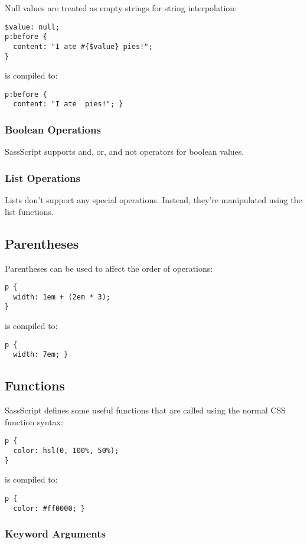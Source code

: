 \documentclass[10pt]{article}
\begin{document}
 Null values are treated as empty strings for string interpolation:
\begin{verbatim}
$value: null;
p:before {
  content: "I ate #{$value} pies!";
}
\end{verbatim}


 is compiled to:
\begin{verbatim}
p:before {
  content: "I ate  pies!"; }
\end{verbatim}
\subsubsection{Boolean Operations}


 SassScript supports and, or, and not operators for boolean values.
\subsubsection{List Operations}


 Lists don’t support any special operations. Instead, they’re manipulated using the list functions.
\subsection{Parentheses}


 Parentheses can be used to affect the order of operations:
\begin{verbatim}
p {
  width: 1em + (2em * 3);
}
\end{verbatim}


 is compiled to:
\begin{verbatim}
p {
  width: 7em; }
\end{verbatim}
\subsection{Functions}


 SassScript defines some useful functions that are called using the normal CSS function syntax:
\begin{verbatim}
p {
  color: hsl(0, 100%, 50%);
}
\end{verbatim}


 is compiled to:
\begin{verbatim}
p {
  color: #ff0000; }
\end{verbatim}
\subsubsection{Keyword Arguments}
\end{document}

